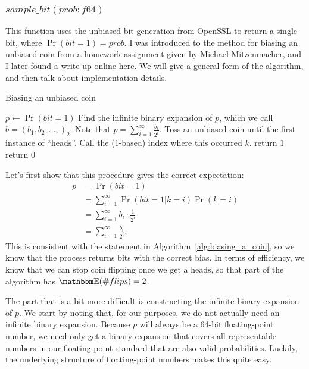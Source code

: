 \documentclass[11pt]{scrartcl} %
\begin{document}
\subsubsection{$sample\_bit(prob: f64)$}
This function uses the unbiased bit generation from OpenSSL to return a single bit, where $\Pr(bit = 1) = prob$.
I was introduced to the method for biasing an unbiased coin from a homework assignment given by Michael Mitzenmacher,
and I later found a write-up online \href{https://amakelov.wordpress.com/2013/10/10/arbitrarily-biasing-a-coin-in-2-expected-tosses/}{here}.
We will give a general form of the algorithm, and then talk about implementation details.
\begin{algorithm}[H]
	\caption{Biasing an unbiased coin}
	\label{alg:biasing_a_coin}
	\begin{algorithmic}[1]
		\State $p \gets \Pr(bit = 1)$
		\State Find the infinite binary expansion of $p$, which we call $b = (b_1, b_2, \hdots,)_2$.
		Note that $p = \sum_{i=1}^{\infty}\frac{b_i}{2^i}$.
		\State Toss an unbiased coin until the first instance of ``heads''. Call the (1-based) index where this occurred $k$.
			\State return $1$
		\Else
			\State return $0$
		\EndIf
	\end{algorithmic}
\end{algorithm}
Let's first show that this procedure gives the correct expectation:
\begin{align*}
	p &= \Pr(bit = 1) \\
		 &= \sum_{i=1}^{\infty} \Pr(bit = 1 \vert k = i) \Pr(k = i) \\
		 &= \sum_{i=1}^{\infty} b_i \cdot \frac{1}{2^i} \\
		 &= \sum_{i=1}^{\infty}\frac{b_i}{2^i}.
\end{align*}
This is consistent with the statement in Algorithm~\ref{alg:biasing_a_coin}, so we know that
the process returns bits with the correct bias.
In terms of efficiency, we know that we can stop coin flipping once we get a heads,
so that part of the algorithm has $\E(\# flips) = 2$. \newline

The part that is a bit more difficult is constructing the infinite binary expansion of $p$.
We start by noting that, for our purposes, we do not actually need an infinite binary expansion.
Because $p$ will always be a 64-bit floating-point number, we need only get a binary
expansion that covers all representable numbers in our floating-point standard that are
also valid probabilities.
Luckily, the underlying structure of floating-point numbers makes this quite easy. \newline
\end{document}
